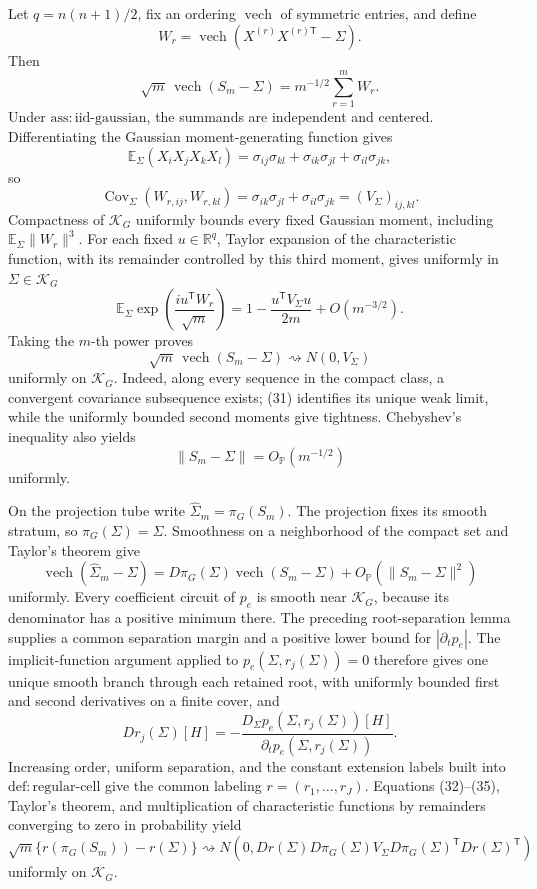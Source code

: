 Let \(q=n(n+1)/2\), fix an ordering \(\operatorname{vech}\) of symmetric entries, and define
\[
 W_r=\operatorname{vech}\!\left(X^{(r)}X^{(r)\mathsf T}-\Sigma\right).
\tag{27}
\]
Then
\[
 \sqrt m\,\operatorname{vech}(S_m-\Sigma)
 =m^{-1/2}\sum_{r=1}^m W_r.
\tag{28}
\]
Under \(\mathrm{ass:iid\mbox{-}gaussian}\), the summands are independent and centered.  Differentiating the Gaussian moment-generating function gives
\[
 \mathbb E_\Sigma(X_iX_jX_kX_l)
 =\sigma_{ij}\sigma_{kl}+\sigma_{ik}\sigma_{jl}+\sigma_{il}\sigma_{jk},
\tag{29}
\]
so
\[
 \operatorname{Cov}_\Sigma(W_{r,ij},W_{r,kl})
 =\sigma_{ik}\sigma_{jl}+\sigma_{il}\sigma_{jk}
 =(V_\Sigma)_{ij,kl}.
\tag{30}
\]
Compactness of \(\mathcal K_G\) uniformly bounds every fixed Gaussian moment, including \(\mathbb E_\Sigma\|W_r\|^3\).  For each fixed \(u\in\mathbb R^q\), Taylor expansion of the characteristic function, with its remainder controlled by this third moment, gives uniformly in \(\Sigma\in\mathcal K_G\)
\[
 \mathbb E_\Sigma\exp\!\left(\frac{i u^{\mathsf T}W_r}{\sqrt m}\right)
 =1-\frac{u^{\mathsf T}V_\Sigma u}{2m}+O(m^{-3/2}).
\tag{31}
\]
Taking the \(m\)-th power proves
\[
 \sqrt m\,\operatorname{vech}(S_m-\Sigma)
 \rightsquigarrow N(0,V_\Sigma)
\tag{32}
\]
uniformly on \(\mathcal K_G\).  Indeed, along every sequence in the compact class, a convergent covariance subsequence exists; (31) identifies its unique weak limit, while the uniformly bounded second moments give tightness.  Chebyshev's inequality also yields
\[
 \|S_m-\Sigma\|=O_{\mathbb P}(m^{-1/2})
\tag{33}
\]
uniformly.

On the projection tube write \(\widehat\Sigma_m=\pi_G(S_m)\).  The projection fixes its smooth stratum, so \(\pi_G(\Sigma)=\Sigma\).  Smoothness on a neighborhood of the compact set and Taylor's theorem give
\[
 \operatorname{vech}(\widehat\Sigma_m-\Sigma)
 =D\pi_G(\Sigma)\operatorname{vech}(S_m-\Sigma)
 +O_{\mathbb P}(\|S_m-\Sigma\|^2)
\tag{34}
\]
uniformly.  Every coefficient circuit of \(p_e\) is smooth near \(\mathcal K_G\), because its denominator has a positive minimum there.  The preceding root-separation lemma supplies a common separation margin and a positive lower bound for \(|\partial_t p_e|\).  The implicit-function argument applied to
\(p_e(\Sigma,r_j(\Sigma))=0\) therefore gives one unique smooth branch through each retained root, with uniformly bounded first and second derivatives on a finite cover, and
\[
 Dr_j(\Sigma)[H]
 =-\frac{D_\Sigma p_e(\Sigma,r_j(\Sigma))[H]}
         {\partial_t p_e(\Sigma,r_j(\Sigma))}.
\tag{35}
\]
Increasing order, uniform separation, and the constant extension labels built into \(\mathrm{def:regular\mbox{-}cell}\) give the common labeling \(r=(r_1,\ldots,r_J)\).  Equations (32)--(35), Taylor's theorem, and multiplication of characteristic functions by remainders converging to zero in probability yield
\[
 \sqrt m\{r(\pi_G(S_m))-r(\Sigma)\}
 \rightsquigarrow N\!\left(0,
 Dr(\Sigma)D\pi_G(\Sigma)V_\Sigma
 D\pi_G(\Sigma)^{\mathsf T}Dr(\Sigma)^{\mathsf T}
 \right)
\tag{36}
\]
uniformly on \(\mathcal K_G\).


